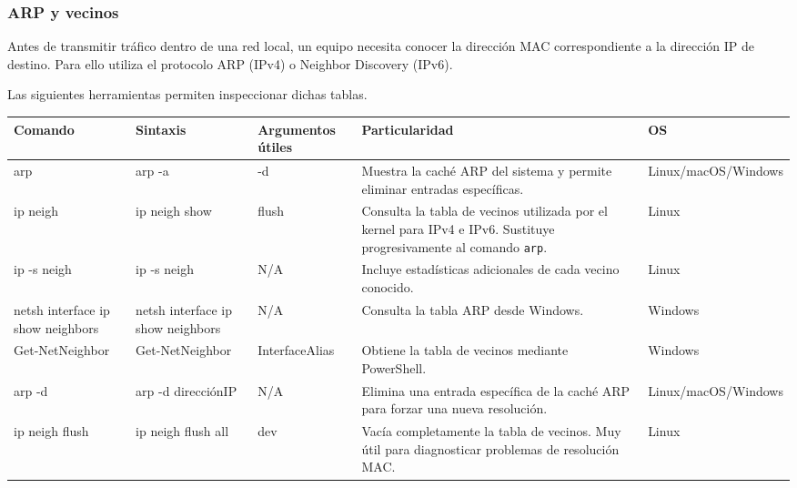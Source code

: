 \documentclass[a4paper,10pt]{article}
\begin{document}
\subsubsection{ARP y vecinos}

Antes de transmitir tráfico dentro de una red local, un equipo necesita conocer
la dirección MAC correspondiente a la dirección IP de destino. Para ello utiliza
el protocolo ARP (IPv4) o Neighbor Discovery (IPv6).

Las siguientes herramientas permiten inspeccionar dichas tablas.

\begin{longtable}{|p{2.8cm}|p{3cm}|p{4cm}|p{5.6cm}|p{1.5cm}|}

\hline
Comando &
Sintaxis &
Argumentos útiles &
Particularidad &
OS
\\
\hline
\endhead

arp &
arp -a &
-d &
Muestra la caché ARP del sistema y permite eliminar entradas específicas. &
Linux/macOS/Windows
\\
\hline

ip neigh &
ip neigh show &
flush &
Consulta la tabla de vecinos utilizada por el kernel para IPv4 e IPv6. Sustituye progresivamente al comando \texttt{arp}. &
Linux
\\
\hline

ip -s neigh &
ip -s neigh &
N/A &
Incluye estadísticas adicionales de cada vecino conocido. &
Linux
\\
\hline

netsh interface ip show neighbors &
netsh interface ip show neighbors &
N/A &
Consulta la tabla ARP desde Windows. &
Windows
\\
\hline

Get-NetNeighbor &
Get-NetNeighbor &
InterfaceAlias &
Obtiene la tabla de vecinos mediante PowerShell. &
Windows
\\
\hline

arp -d &
arp -d direcciónIP &
N/A &
Elimina una entrada específica de la caché ARP para forzar una nueva resolución. &
Linux/macOS/Windows
\\
\hline

ip neigh flush &
ip neigh flush all &
dev &
Vacía completamente la tabla de vecinos. Muy útil para diagnosticar problemas de resolución MAC. &
Linux
\\
\hline

\end{longtable}


\end{document}
